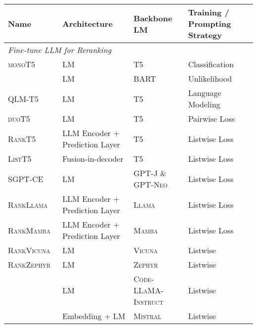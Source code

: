 \begin{table*}[ht]
\centering
{} %
\resizebox{1\textwidth}{!}
{
\begin{tabular}{llll}
\toprule
\textbf{Name} & \textbf{Architecture} & \textbf{Backbone LM} & \textbf{Training / Prompting Strategy} \\
\midrule
\multicolumn{4}{l}{\emph{Fine-tune LLM for Reranking}} \\
\textsc{monoT5}~\cite{nogueira2020documentrankingpretrainedsequencetosequence} & LM & \textsc{T5} & Classification \\
\citet{nogueira-dos-santos-etal-2020-beyond} & LM & \textsc{BART} & Unlikelihood \\
\textsc{QLM-T5}~\cite{zhuang2021deep} & LM & \textsc{T5} & Language Modeling \\
\textsc{duoT5}~\cite{pradeep2021expando} & LM & \textsc{T5} & Pairwise Loss \\
\textsc{RankT5}~\cite{zhuang2023rankt5} & LLM Encoder + Prediction Layer & \textsc{T5} & Listwise Loss \\
\textsc{ListT5}~\cite{yoon-etal-2024-listt5} & Fusion-in-decoder & \textsc{T5} & Listwise Loss \\
\textsc{SGPT-CE}~\cite{muennighoff2022sgpt} & LM & \textsc{GPT-J} \& \textsc{GPT-Neo} & Listwise Loss \\
\textsc{RankLlama}~\cite{ma2024fine} & LLM Encoder + Prediction Layer & \textsc{Llama} & Listwise Loss \\
\textsc{RankMamba}~\cite{xu2024rankmamba} & LLM Encoder + Prediction Layer & \textsc{Mamba} & Listwise Loss \\
\textsc{RankVicuna}~\cite{pradeep2023rankvicunazeroshotlistwisedocument} & LM & \textsc{Vicuna} & Listwise \\
\textsc{RankZephyr}~\cite{pradeep2023rankzephyreffectiverobustzeroshot} & LM & \textsc{Zephyr} & Listwise \\
\citet{zhang2023rank} & LM & \textsc{Code-LLaMA-Instruct} & Listwise \\
\citet{liu2024leveraging} & Embedding + LM & \textsc{Mistral} & Listwise \\


\end{tabular}}
\end{table*}

